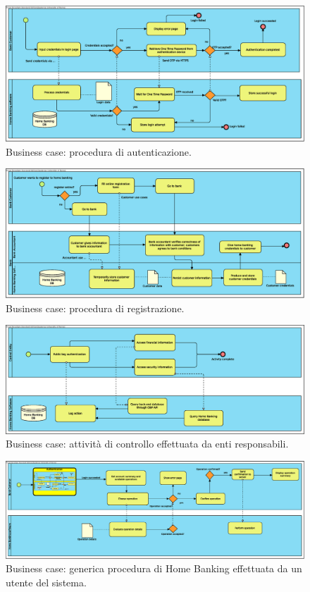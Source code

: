 \documentclass[10pt]{softeng} %
\begin{document}
\begin{figure}[hbt]
	\centering
	\includegraphics[width=\textheight, angle=90]{Images/Authentication.eps}
	\caption{Business case: procedura di autenticazione.}
	\label{fig:business_case_authentication}
\end{figure}

\begin{figure}[hbt]
	\centering
	\includegraphics[width=\textheight, angle=90]{Images/Home_Banking_registration.eps}
	\caption{Business case: procedura di registrazione.}
	\label{fig:business_case_registration}
\end{figure}

\begin{figure}[hbt]
	\centering
	\includegraphics[width=\textheight, angle=90]{Images/Home_Banking_control_activity.eps}
	\caption{Business case: attivit\`a di controllo effettuata da enti responsabili.}
	\label{fig:business_case_control_activity}
\end{figure}

\begin{figure}[hbt]
	\centering
	\includegraphics[width=\textheight, angle=90]{Images/Home_Banking_generic_action.eps}
	\caption{Business case: generica procedura di Home Banking effettuata da un utente del sistema.}
	\label{fig:business_case_generic_operation}
\end{figure}
\end{document}
